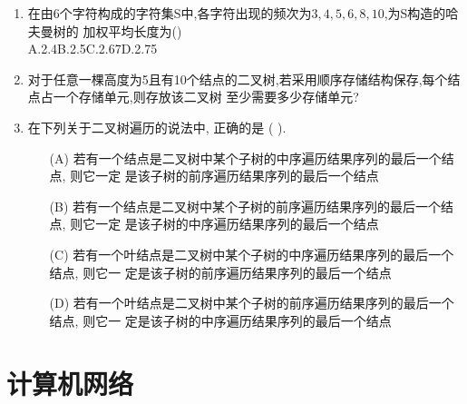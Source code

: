 \documentclass[12pt, a4paper, oneside, UTF8]{ctexbook}
\begin{document}
\begin{enumerate}
    \item 在由6个字符构成的字符集S中,各字符出现的频次为\underline{$3,4,5,6,8,10$},为S构造的哈夫曼树的
    加权平均长度为() \\
    A.2.4\qquad\qquad B.2.5\qquad\qquad C.2.67\qquad\qquad D.2.75

    \item 对于任意一棵高度为5且有10个结点的二叉树,若采用顺序存储结构保存,每个结点占一个存储单元,则存放该二叉树
    至少需要多少存储单元? 

    \item 在下列关于二叉树遍历的说法中, 正确的是 (   ).
    \begin{enumerate}
        \item[(A)]若有一个结点是二叉树中某个子树的中序遍历结果序列的最后一个结点, 则它一定
        是该子树的前序遍历结果序列的最后一个结点
        \item[(B)] 若有一个结点是二叉树中某个子树的前序遍历结果序列的最后一个结点, 则它一定
        是该子树的中序遍历结果序列的最后一个结点
        \item[(C)]若有一个叶结点是二叉树中某个子树的中序遍历结果序列的最后一个结点, 则它一
        定是该子树的前序遍历结果序列的最后一个结点
        \item[(D)] 若有一个叶结点是二叉树中某个子树的前序遍历结果序列的最后一个结点, 则它一
        定是该子树的中序遍历结果序列的最后一个结点
    \end{enumerate}

\end{enumerate}

\newpage
\section{计算机网络}
\end{document}
